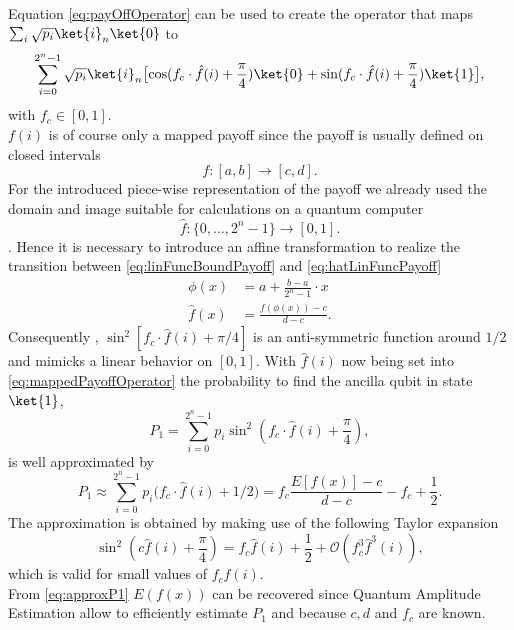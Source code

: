 \documentclass[../../main.tex]{subfiles}
\begin{document}
Equation \ref{eq:payOffOperator} can be used to create the operator that maps $\sum_i \sqrt{p_i} \ket{i}_n \ket{0}$ to
\begin{equation}\label{eq:mappedPayoffOperator}
  \sum_{i=0}^{2^n-1} \sqrt{p_i} \ket{i}_n \bigl[ \text{cos}( f_c \cdot \hat{f}(i) + \frac{\pi}{4}) \ket{0} +
   \text{sin} (f_c \cdot \hat{f}(i) + \frac{\pi}{4}) \ket{1} \bigr],
\end{equation}
with $f_c \in [ 0,1 ]$. \\
$f(i)$ is of course only a mapped payoff since the payoff is usually defined on closed intervals
\begin{equation}\label{eq:linFuncBoundPayoff}
  f: [ a,b ] \rightarrow [ c,d ].
\end{equation}
For the introduced piece-wise representation of the payoff we already used the domain and image suitable for calculations on a quantum computer
\begin{equation}\label{eq:hatLinFuncPayoff}
  \hat{f}: \{0,...,2^n-1 \} \rightarrow [ 0,1 ].
\end{equation}.
Hence it is necessary to introduce an affine transformation to realize the transition between \ref{eq:linFuncBoundPayoff} and \ref{eq:hatLinFuncPayoff}
\begin{align}\label{eq:affinTransformPayoff}
  \phi(x) &= a + \frac{b-a}{2^n-1} \cdot x \\
  \hat{f}(x) &= \frac{f(\phi(x))-c}{d-c}.
\end{align}
Consequently , $\sin^2 [f_c \cdot \hat{f}(i) + \pi/4 ] $ is an anti-symmetric function around $1/2$ and mimicks a linear behavior on $[0,1]$.
With $\hat{f}(i)$ now being set into \ref{eq:mappedPayoffOperator} the probability to find the ancilla qubit in state $\ket{1}$,
\begin{equation}\label{eq:probability1MappedLinFunc}
  P_1 = \sum_{i=0}^{2^n-1} p_i \sin^2(f_c \cdot \hat{f}(i) + \frac{\pi}{4}), 
\end{equation}
is well approximated by 
\begin{equation}\label{eq:approxP1}
  P_1 \approx \sum_{i=0}^{2^n-1} p_i \bigl( f_c \cdot \hat{f}(i) + 1/2 \bigr) = f_c \frac{E[ f(x) ] - c}{d-c} - f_c + \frac{1}{2}.
\end{equation}
The approximation is obtained by making use of the following Taylor expansion
\begin{equation}\label{eq:sinTaylor}
  \sin^2(c \hat{f}(i) + \frac{\pi}{4}) = f_c \hat{f}(i) + \frac{1}{2} + \mathcal{O}(f_c^3 \hat{f}^3(i)),
\end{equation}
which is valid for small values of $ f_c \hat{f}(i) $.\\
From \ref{eq:approxP1} $E(f(x))$ can be recovered since Quantum Amplitude Estimation allow to efficiently estimate $P_1$ and because $c, d$ and $f_c$
are known.
\end{document}
